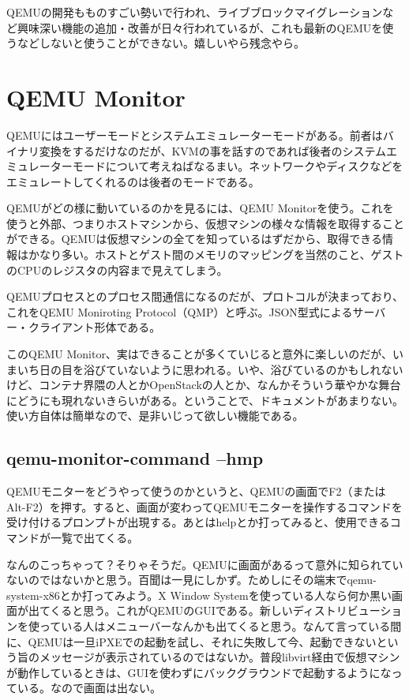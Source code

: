 \documentclass[9pt,b5paper,tombo]{jsbook}
\begin{document}
QEMUの開発もものすごい勢いで行われ、ライブブロックマイグレーションなど興味深い機能の追加・改善が日々行われているが、これも最新のQEMUを使うなどしないと使うことができない。嬉しいやら残念やら。

\section{QEMU Monitor}

QEMUにはユーザーモードとシステムエミュレーターモードがある。前者はバイナリ変換をするだけなのだが、KVMの事を話すのであれば後者のシステムエミュレーターモードについて考えねばなるまい。ネットワークやディスクなどをエミュレートしてくれるのは後者のモードである。

QEMUがどの様に動いているのかを見るには、QEMU Monitorを使う。これを使うと外部、つまりホストマシンから、仮想マシンの様々な情報を取得することができる。QEMUは仮想マシンの全てを知っているはずだから、取得できる情報はかなり多い。ホストとゲスト間のメモリのマッピングを当然のこと、ゲストのCPUのレジスタの内容まで見えてしまう。

QEMUプロセスとのプロセス間通信になるのだが、プロトコルが決まっており、これをQEMU Moniroting Protocol（QMP）と呼ぶ。JSON型式によるサーバー・クライアント形体である。

このQEMU Monitor、実はできることが多くていじると意外に楽しいのだが、いまいち日の目を浴びていないように思われる。いや、浴びているのかもしれないけど、コンテナ界隈の人とかOpenStackの人とか、なんかそういう華やかな舞台にどうにも現れないきらいがある。ということで、ドキュメントがあまりない。使い方自体は簡単なので、是非いじって欲しい機能である。

\subsection{qemu-monitor-command --hmp}

QEMUモニターをどうやって使うのかというと、QEMUの画面でF2（またはAlt-F2）を押す。すると、画面が変わってQEMUモニターを操作するコマンドを受け付けるプロンプトが出現する。あとはhelpとか打ってみると、使用できるコマンドが一覧で出てくる。

なんのこっちゃって？そりゃそうだ。QEMUに画面があるって意外に知られていないのではないかと思う。百聞は一見にしかず。ためしにその端末でqemu-system-x86とか打ってみよう。X Window Systemを使っている人なら何か黒い画面が出てくると思う。これがQEMUのGUIである。新しいディストリビューションを使っている人はメニューバーなんかも出てくると思う。なんて言っている間に、QEMUは一旦iPXEでの起動を試し、それに失敗して今、起動できないという旨のメッセージが表示されているのではないか。普段libvirt経由で仮想マシンが動作しているときは、GUIを使わずにバックグラウンドで起動するようになっている。なので画面は出ない。
\end{document}
